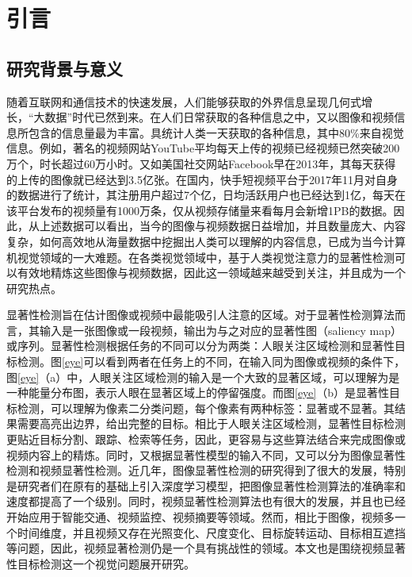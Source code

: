 \chapter{引\quad 言}
\renewcommand{\leftmark}{第一章\quad 引\quad 言}

\section{研究背景与意义}
随着互联网和通信技术的快速发展，人们能够获取的外界信息呈现几何式增长，“大数据”时代已然到来。在人们日常获取的各种信息之中，又以图像和视频信息所包含的信息量最为丰富。具统计人类一天获取的各种信息，其中80\%来自视觉信息。例如，著名的视频网站YouTube平均每天上传的视频已经视频已然突破200万个，时长超过60万小时。又如美国社交网站Facebook早在2013年，其每天获得的上传的图像就已经达到3.5亿张。在国内，快手短视频平台于2017年11月对自身的数据进行了统计，其注册用户超过7个亿，日均活跃用户也已经达到1亿，每天在该平台发布的视频量有1000万条，仅从视频存储量来看每月会新增1PB的数据。因此，从上述数据可以看出，当今的图像与视频数据日益增加，并且数量庞大、内容复杂，如何高效地从海量数据中挖掘出人类可以理解的内容信息，已成为当今计算机视觉领域的一大难题。在各类视觉领域中，基于人类视觉注意力的显著性检测可以有效地精炼这些图像与视频数据，因此这一领域越来越受到关注，并且成为一个研究热点。

显著性检测旨在估计图像或视频中最能吸引人注意的区域。对于显著性检测算法而言，其输入是一张图像或一段视频，输出为与之对应的显著性图（saliency map）或序列。显著性检测根据任务的不同可以分为两类：人眼关注区域检测\cite{cornia2018predicting,kruthiventi2017deepfix}和显著性目标检测\cite{li2016deepsaliency,DSSalCVPR2017,liu2016dhsnet}。图\ref{eye}可以看到两者在任务上的不同，在输入同为图像或视频的条件下，图\ref{eye}（a）中，人眼关注区域检测的输入是一个大致的显著区域，可以理解为是一种能量分布图，表示人眼在显著区域上的停留强度。而图\ref{eye}（b）是显著性目标检测，可以理解为像素二分类问题，每个像素有两种标签：显著或不显著。其结果需要高亮出边界，给出完整的目标。相比于人眼关注区域检测，显著性目标检测更贴近目标分割\cite{Felzenszwalb2004Efficient}、跟踪\cite{wu2017kernalised}、检索\cite{vehiclere-identification3}等任务，因此，更容易与这些算法结合来完成图像或视频内容上的精炼。同时，又根据显著性模型的输入不同，又可以分为图像显著性检测和视频显著性检测。近几年，图像显著性检测的研究得到了很大的发展，特别是研究者们在原有的基础上引入深度学习模型，把图像显著性检测算法的准确率和速度都提高了一个级别。同时，视频显著性检测算法也有很大的发展，并且也已经开始应用于智能交通、视频监控、视频摘要等领域。然而，相比于图像，视频多一个时间维度，并且视频又存在光照变化、尺度变化、目标旋转运动、目标相互遮挡等问题，因此，视频显著检测仍是一个具有挑战性的领域。本文也是围绕视频显著性目标检测这一个视觉问题展开研究。

